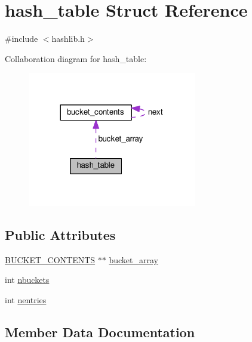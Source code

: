 \hypertarget{structhash__table}{}\section{hash\+\_\+table Struct Reference}
\label{structhash__table}


{\ttfamily \#include $<$hashlib.\+h$>$}



Collaboration diagram for hash\+\_\+table\+:
\nopagebreak
\begin{figure}[H]
\begin{center}
\leavevmode
\includegraphics[width=209pt]{structhash__table__coll__graph}
\end{center}
\end{figure}
\subsection*{Public Attributes}
\begin{DoxyCompactItemize}
\item 
\hyperlink{hashlib_8h_aa38d328c0a8fa68156686f7c9d9e6e7f}{B\+U\+C\+K\+E\+T\+\_\+\+C\+O\+N\+T\+E\+N\+TS} $\ast$$\ast$ \hyperlink{structhash__table_a8500015bb5f856d6051a122860e4968a}{bucket\+\_\+array}
\item 
int \hyperlink{structhash__table_aa7de201d163e121b359b32142d261e2f}{nbuckets}
\item 
int \hyperlink{structhash__table_a9e1b774a04e87eb7bef46100c85ec52d}{nentries}
\end{DoxyCompactItemize}


\subsection{Member Data Documentation}
